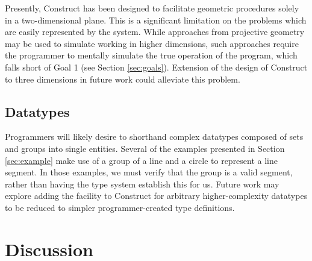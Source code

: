 \documentclass[twoside,11pt]{report}
\begin{document}
Presently, Construct has been designed to facilitate geometric procedures solely in a two-dimensional plane. 
This is a significant limitation on the problems which are easily represented by the system. 
While approaches from projective geometry may be used to simulate working in higher dimensions, such approaches require the programmer to mentally simulate the true operation of the program, which falls short of Goal 1 (see Section \ref{sec:goals}).
Extension of the design of Construct to three dimensions in future work could alleviate this problem.

\subsection{Datatypes}

Programmers will likely desire to shorthand complex datatypes composed of sets and groups into single entities. 
Several of the examples presented in Section \ref{sec:example} make use of a group of a line and a circle to represent a line segment. 
In those examples, we must verify that the group is a valid segment, rather than having the type system establish this for us.
Future work may explore adding the facility to Construct for arbitrary higher-complexity datatypes to be reduced to simpler programmer-created type definitions.

\section{Discussion}

\appendix

\nocite{*}



\end{document}
